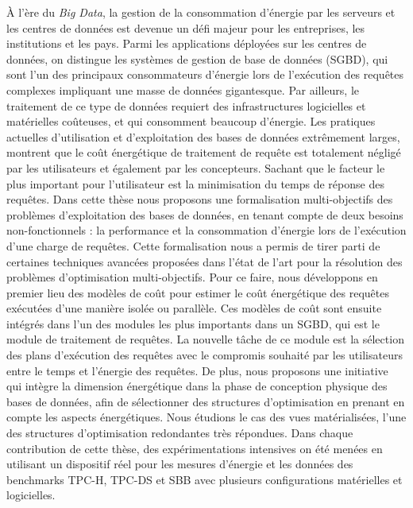 \DontNumberAbstractPages

\begin{ThesisAbstract}
\begin{FrenchAbstract}
À l'ère du \textit{Big Data}, la gestion de la consommation d'énergie par les serveurs et les centres de données est devenue un défi majeur pour les entreprises, les institutions et les pays. Parmi les applications déployées sur les centres de données, on distingue les systèmes de gestion de base de données (SGBD), qui sont l'un des principaux consommateurs d'énergie lors de l'exécution des requêtes complexes impliquant une masse de données gigantesque.
Par ailleurs, le traitement de ce type de données requiert des infrastructures logicielles et matérielles coûteuses, et qui consomment beaucoup d'énergie. Les pratiques actuelles d'utilisation et d'exploitation des bases de données extrêmement larges, montrent que le coût énergétique de traitement de requête est totalement négligé par les utilisateurs et également par les concepteurs. Sachant que le facteur le plus important pour l'utilisateur est la minimisation du temps de réponse des requêtes. Dans cette thèse nous proposons une formalisation multi-objectifs des problèmes d'exploitation des bases de données, en tenant compte de deux besoins non-fonctionnels : la performance et la consommation d'énergie lors de l'exécution d'une charge de requêtes. Cette formalisation nous a permis de tirer parti de certaines techniques avancées proposées dans l'état de l'art pour la résolution des problèmes d'optimisation multi-objectifs. Pour ce faire, nous développons en premier lieu des modèles de coût pour estimer le coût énergétique des requêtes exécutées d'une manière isolée ou parallèle. Ces modèles de coût sont ensuite intégrés dans l'un des modules les plus importants dans un SGBD, qui est le module de traitement de requêtes. La nouvelle tâche de ce module est la sélection des plans d'exécution des requêtes avec le compromis souhaité par les utilisateurs entre le temps et l'énergie des requêtes. De plus, nous proposons une initiative qui intègre la dimension énergétique dans la phase de conception physique des bases de données, afin de sélectionner des structures d'optimisation en prenant en compte les aspects énergétiques. Nous étudions le cas des vues matérialisées, l'une des structures d'optimisation redondantes très répondues. Dans chaque contribution de cette thèse, des expérimentations intensives on été menées en utilisant un dispositif réel pour les mesures d'énergie et les données des benchmarks TPC-H, TPC-DS et SBB avec plusieurs configurations matérielles et logicielles. %


\end{FrenchAbstract}
\end{ThesisAbstract}
